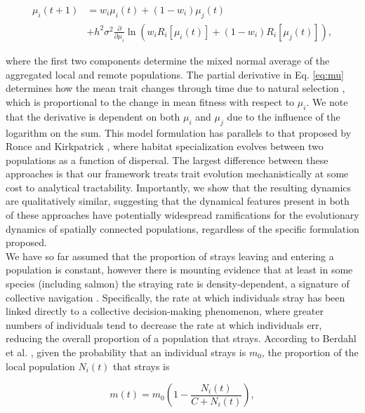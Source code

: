 \documentclass{revtex4}
\begin{document}
\begin{align}
  \label{eq:mu}
  \mu_i(t+1) &= w_i\mu_i(t) + (1-w_i)\mu_j(t) \\ \nonumber
  &+ h^2\sigma^2\frac{\partial}{\partial \mu_i}\ln\left(w_i R_i[\mu_i(t)] + (1-w_i)R_i[\mu_j(t)]  \right),
\end{align}

\noindent where the first two components determine the mixed normal average of the aggregated local and remote populations.
The partial derivative in Eq. \ref{eq:mu} determines how the mean trait changes through time due to natural selection \citep{Lande:1976ga}, which is proportional to the change in mean fitness with respect to $\mu_i$.
We note that the derivative is dependent on both $\mu_i$ and $\mu_j$ due to the influence of the logarithm on the sum.
This model formulation has parallels to that proposed by Ronce and Kirkpatrick \citep{Ronce:2001dp}, where habitat specialization evolves between two populations as a function of dispersal.
The largest difference between these approaches is that our framework treats trait evolution mechanistically at some cost to analytical tractability.
Importantly, we show that the resulting dynamics are qualitatively similar, suggesting that the dynamical features present in both of these approaches have potentially widespread ramifications for the evolutionary dynamics of spatially connected populations, regardless of the specific formulation proposed.
\\

\noindent We have so far assumed that the proportion of strays leaving and entering a population is constant, however there is mounting evidence that at least in some species (including salmon) the straying rate is density-dependent, a signature of collective navigation \citep{Berdahl:2016dx,Bett:2017ha}.
Specifically, the rate at which individuals stray has been linked directly to a collective decision-making phenomenon, where greater numbers of individuals tend to decrease the rate at which individuals err, reducing the overall proportion of a population that strays.
According to Berdahl et al. \citep{Berdahl:2014bl,Berdahl:2016dx}, given the probability that an individual strays is $m_0$, the proportion of the local population $N_i(t)$ that strays is

\begin{equation}
  m(t) = m_0\left(1- \frac{N_i(t)}{C+N_i(t)}\right),
  \label{eq:ddm}
\end{equation}
\end{document}
